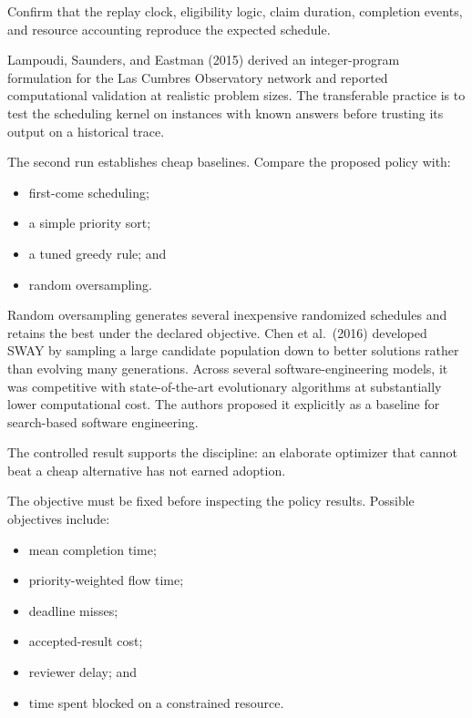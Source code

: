 Confirm that the replay clock, eligibility logic, claim duration, completion events, and resource accounting reproduce the expected schedule.

Lampoudi, Saunders, and Eastman (2015) derived an integer-program formulation for the Las Cumbres Observatory network and reported computational validation at realistic problem sizes. The transferable practice is to test the scheduling kernel on instances with known answers before trusting its output on a historical trace.


The second run establishes cheap baselines. Compare the proposed policy with:

\begin{itemize}
\tightlist
\item
  first-come scheduling;
\item
  a simple priority sort;
\item
  a tuned greedy rule; and
\item
  random oversampling.
\end{itemize}

Random oversampling generates several inexpensive randomized schedules and retains the best under the declared objective. Chen et al.~(2016) developed SWAY by sampling a large candidate population down to better solutions rather than evolving many generations. Across several software-engineering models, it was competitive with state-of-the-art evolutionary algorithms at substantially lower computational cost. The authors proposed it explicitly as a baseline for search-based software engineering.

The controlled result supports the discipline: an elaborate optimizer that cannot beat a cheap alternative has not earned adoption.


The objective must be fixed before inspecting the policy results. Possible objectives include:

\begin{itemize}
\tightlist
\item
  mean completion time;
\item
  priority-weighted flow time;
\item
  deadline misses;
\item
  accepted-result cost;
\item
  reviewer delay; and
\item
  time spent blocked on a constrained resource.
\end{itemize}

